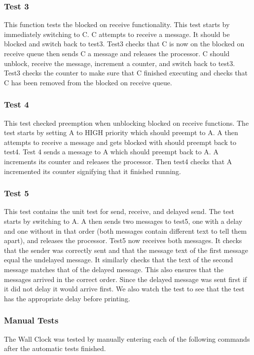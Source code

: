 \documentclass[11pt, oneside]{article}
\begin{document}
\subsubsection{Test 3}
This function tests the blocked on receive functionality. This test starts by immediately switching to C. C attempts to receive a message. It should be blocked and switch back to test3. Test3 checks that C is now on the blocked on receive queue then sends C a message and releases the processor. C should unblock, receive the message, increment a counter, and switch back to test3. Test3 checks the counter to make sure that C finished executing and checks that C has been removed from the blocked on receive queue.
\subsubsection{Test 4}
This test checked preemption when unblocking blocked on receive functions. The test starts by setting A to HIGH priority which should preempt to A. A then attempts to receive a message and gets blocked with should preempt back to test4. Test 4 sends a message to A which should preempt back to A. A increments its counter and releases the processor. Then test4 checks that A incremented its counter signifying that it finished running.
\subsubsection{Test 5}
This test contains the unit test for send, receive, and delayed send. The test starts by switching to A. A then sends two messages to test5, one with a delay and one without in that order (both messages contain different text to tell them apart), and releases the processor. Test5 now receives both messages. It checks that the sender was correctly sent and that the message text of the first message equal the undelayed message. It similarly checks that the text of the second message matches that of the delayed message. This also ensures that the messages arrived in the correct order. Since the delayed message was sent first if it did not delay it would arrive first. We also watch the test to see that the test has the appropriate delay before printing.
\subsubsection{Manual Tests}
The Wall Clock was tested by manually entering each of the following commands after the automatic tests finished.
\end{document}
